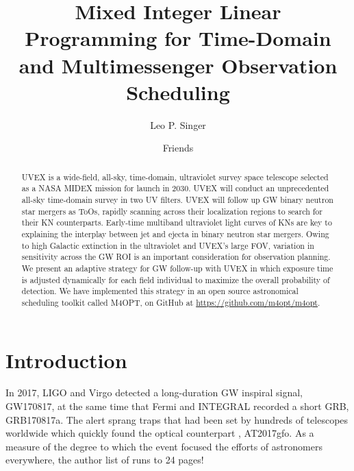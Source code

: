 \documentclass[twocolumn,times]{aastex631}
\begin{document}
\title{Mixed Integer Linear Programming for Time-Domain and Multimessenger Observation Scheduling}

\author[0000-0001-9898-5597]{Leo P. Singer}

\author{Friends}

\begin{abstract}
\Ac{UVEX} is a wide-field, all-sky, time-domain, ultraviolet survey space telescope selected as a NASA \ac{MIDEX} mission for launch in 2030. \ac{UVEX} will conduct an unprecedented all-sky time-domain survey in two \ac{UV} filters. \ac{UVEX} will follow up \ac{GW} binary neutron star mergers as \acp{ToO}, rapidly scanning across their localization regions to search for their \ac{KN} counterparts. Early-time multiband ultraviolet light curves of \acp{KN} are key to explaining the interplay between jet and ejecta in binary neutron star mergers. Owing to high Galactic extinction in the ultraviolet and \ac{UVEX}'s large \ac{FOV}, variation in sensitivity across the \ac{GW} \ac{ROI} is an important consideration for observation planning. We present an adaptive strategy for \ac{GW} follow-up with \ac{UVEX} in which exposure time is adjusted dynamically for each field individual to maximize the overall probability of detection. We have implemented this strategy in an open source astronomical scheduling toolkit called \ac{M4OPT}, on GitHub at \url{https://github.com/m4opt/m4opt}.
\end{abstract}


\acresetall

\section{Introduction} \label{sec:intro}

In 2017, \ac{LIGO} and Virgo \citep{2017PhRvL.119p1101A} detected a long-duration \ac{GW} inspiral signal, GW170817, at the same time that Fermi \citep{2017ApJ...848L..14G} and INTEGRAL \citep{2017ApJ...848L..15S} recorded a short \ac{GRB}, GRB170817a. The alert sprang traps that had been set by hundreds of telescopes worldwide \citep{2014ApJS..211....7A,2016ApJ...826L..13A} which quickly found the optical counterpart \citep{2017Sci...358.1556C}, AT2017gfo. As a measure of the degree to which the event focused the efforts of astronomers everywhere, the author list of \citet{2017ApJ...848L..12A} runs to 24 pages!
\end{document}
